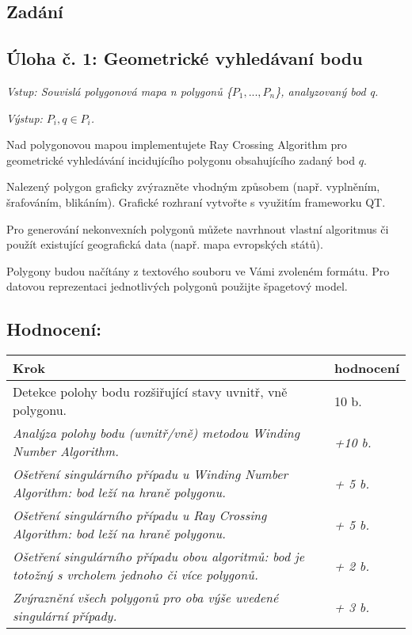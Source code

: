 \documentclass[15pt]{article}
\begin{document}
\begin{spacing}{1.5}

\section*{Zadání}
\subsection*{\textbf{Úloha č. 1: Geometrické vyhledávaní bodu}}
\noindent\textit{Vstup: Souvislá polygonová mapa n polygonů \{$P_1, ..., P_n$\}, analyzovaný bod q.}

\noindent\textit{Výstup: $P_i, q \in P_i$.}

\noindent Nad polygonovou mapou implementujete Ray Crossing Algorithm pro geometrické vyhledávání incidujícího polygonu obsahujícího zadaný bod $q$.

\noindent Nalezený polygon graficky zvýrazněte vhodným způsobem (např. vyplněním, šrafováním, blikáním). Grafické rozhraní vytvořte s využitím frameworku QT.

\noindent Pro generování nekonvexních polygonů můžete navrhnout vlastní algoritmus či použít existující geografická data (např. mapa evropských států).

\noindent Polygony budou načítány z textového souboru ve Vámi zvoleném formátu. Pro datovou reprezentaci jednotlivých polygonů použijte špagetový model.

\vspace{1cm}
\subsection*{\textbf{Hodnocení:}}

\begin{center}
\begin{tabular}{|l|l|}
\hline
\textbf{Krok}                                                                                  & \textbf{hodnocení} \\ [0.5ex]  \hline\hline
Detekce polohy bodu rozšiřující stavy uvnitř, vně polygonu.                                    &  10 b.              \\ \hline
\textit{Analýza polohy bodu (uvnitř/vně) metodou Winding Number Algorithm.}                    & \textit{+10 b.}    \\ \hline
\textit{Ošetření singulárního případu u Winding Number Algorithm: bod leží na hraně polygonu.} & \textit{+ 5 b.}    \\ \hline
\textit{Ošetření singulárního případu u Ray Crossing Algorithm: bod leží na hraně polygonu.}   & \textit{+ 5 b.}    \\ \hline
\textit{Ošetření singulárního případu obou algoritmů: bod je totožný s vrcholem jednoho či více polygonů.} & \textit{+ 2 b.} \\ \hline
\textit{Zvýraznění všech polygonů pro oba výše uvedené singulární případy.}                    & \textit{+ 3 b.}    \\ \hline
\end{tabular}
\end{center}


\end{spacing}
\end{document}
